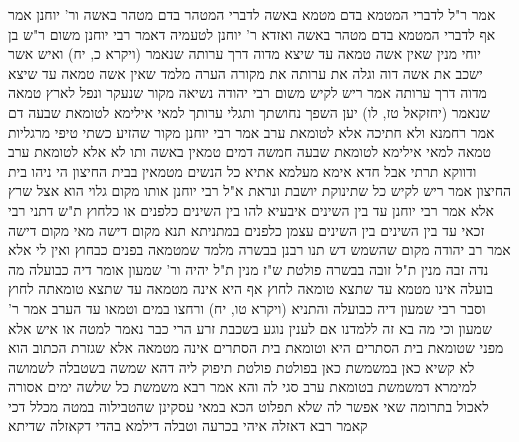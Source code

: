 \documentclass[12pt, openany]{book}
\begin{document}
{אמר ר"ל  לדברי המטמא בדם מטמא באשה לדברי המטהר בדם מטהר באשה  ור' יוחנן אמר  אף לדברי המטמא בדם מטהר באשה 
ואזדא ר' יוחנן לטעמיה דאמר רבי יוחנן משום ר"ש בן יוחי  מנין שאין אשה טמאה עד שיצא מדוה דרך ערותה שנאמר  (ויקרא כ, יח) ואיש אשר ישכב את אשה דוה וגלה את ערותה את מקורה הערה מלמד שאין אשה טמאה עד שיצא מדוה דרך ערותה 
אמר ריש לקיש משום רבי יהודה נשיאה  מקור שנעקר ונפל לארץ טמאה שנאמר (יחזקאל טז, לו) יען השפך נחושתך ותגלי ערותך 
למאי  אילימא לטומאת שבעה דם אמר רחמנא ולא חתיכה  אלא לטומאת ערב
אמר רבי יוחנן  מקור שהזיע כשתי טיפי מרגליות טמאה  למאי  אילימא לטומאת שבעה חמשה דמים טמאין באשה ותו לא  אלא לטומאת ערב ודווקא תרתי אבל חדא אימא מעלמא אתיא
כל הנשים מטמאין בבית החיצון הי ניהו בית החיצון  אמר ריש לקיש  כל שתינוקת יושבת ונראת 
א"ל רבי יוחנן  אותו מקום גלוי הוא אצל שרץ  אלא אמר רבי יוחנן  עד בין השינים 
איבעיא להו  בין השינים  כלפנים או כלחוץ  ת"ש דתני רבי זכאי  עד בין השינים בין השינים עצמן כלפנים 
במתניתא תנא  מקום דישה  מאי מקום דישה  אמר רב יהודה  מקום שהשמש דש 
תנו רבנן  בבשרה מלמד שמטמאה בפנים כבחוץ  ואין לי אלא נדה זבה מנין ת"ל זובה בבשרה 
פולטת ש"ז מנין ת"ל יהיה  ור' שמעון אומר  דיה כבועלה מה בועלה אינו מטמא עד שתצא טומאה לחוץ אף היא אינה מטמאה עד שתצא טומאתה לחוץ 
וסבר רבי שמעון דיה כבועלה  והתניא (ויקרא טו, יח) ורחצו במים וטמאו עד הערב  אמר ר' שמעון  וכי מה בא זה ללמדנו  אם לענין נוגע בשכבת זרע הרי כבר נאמר למטה או איש
אלא מפני שטומאת בית הסתרים היא וטומאת בית הסתרים אינה מטמאה אלא שגזרת הכתוב הוא 
לא קשיא כאן במשמשת כאן בפולטת 
פולטת תיפוק ליה דהא שמשה  בשטבלה לשמושה 
למימרא דמשמשת בטומאת ערב סגי לה  והא אמר רבא  משמשת כל שלשה ימים אסורה לאכול בתרומה שאי אפשר לה שלא תפלוט 
הכא במאי עסקינן שהטבילוה במטה  מכלל דכי קאמר רבא דאזלה איהי בכרעה וטבלה דילמא בהדי דקאזלה שדיתא}
\end{document}
